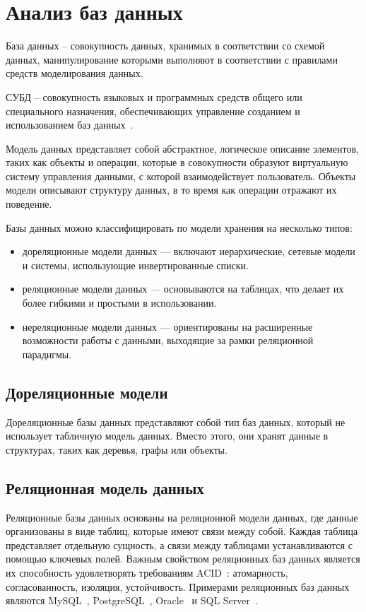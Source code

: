 \section{Анализ баз данных}
База данных -- совокупность данных, хранимых в соответствии со схемой данных, манипулирование которыми выполняют в соответствии с правилами средств моделирования данных.

СУБД -- совокупность языковых и программных средств общего или специального назначения, обеспечивающих управление созданием и использованием баз данных~\cite{williams}.

Модель данных представляет собой абстрактное, логическое описание элементов, таких как объекты и операции, которые в совокупности образуют виртуальную систему управления данными, с которой взаимодействует пользователь. Объекты модели описывают структуру данных, в то время как операции отражают их поведение.

Базы данных можно классифицировать по модели хранения на несколько типов:
\begin{itemize}
    \item дореляционные модели данных --- включают иерархические, сетевые модели и системы, использующие инвертированные списки.
    \item реляционные модели данных --- основываются на таблицах, что делает их более гибкими и простыми в использовании.
    \item нереляционные модели данных --- ориентированы на расширенные возможности работы с данными, выходящие за рамки реляционной парадигмы.
\end{itemize}

\subsection*{Дореляционные модели}
Дореляционные базы данных представляют собой тип баз данных, который не использует табличную модель данных. Вместо этого, они хранят данные в структурах, таких как деревья, графы или объекты. 

\subsection*{Реляционная модель данных}
Реляционные базы данных основаны на реляционной модели данных, где данные организованы в виде таблиц, которые имеют связи между собой. Каждая таблица представляет отдельную сущность, а связи между таблицами устанавливаются с помощью ключевых полей. Важным свойством реляционных баз данных является их способность удовлетворять требованиям ACID~\cite{acid}: атомарность, согласованность, изоляция, устойчивость. Примерами реляционных баз данных являются MySQL~\cite{mysql}, PostgreSQL~\cite{postgres}, Oracle~\cite{oracle} и SQL Server~\cite{sql-server}.

